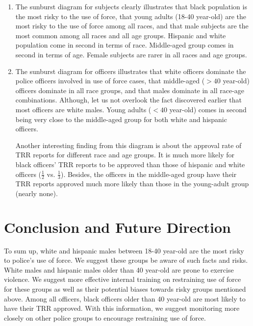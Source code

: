 \documentclass[10pt]{article}
\begin{document}
\begin{enumerate}

\item The sunburst diagram for subjects clearly illustrates that black population is the most risky to the use of force, that young adults (18-40 year-old) are the most risky to the use of force among all races, and that male subjects are the most common among all races and all age groups. Hispanic and white population come in second in terms of race. Middle-aged group comes in second in terms of age. Female subjects are rarer in all races and age groups.

\item The sunburst diagram for officers illustrates that white officers dominate the police officers involved in use of force cases, that middle-aged ($>40$ year-old) officers dominate in all race groups, and that males dominate in all race-age combinations. Although, let us not overlook the fact discovered earlier that most officers are white males. Young adults ($<40$ year-old) comes in second being very close to the middle-aged group for both white and hispanic officers.

Another interesting finding from this diagram is about the approval rate of TRR reports for different race and age groups. It is much more likely for black officers’ TRR reports to be approved than those of hispanic and white officers ($\frac{1}{2}$ vs. $\frac{1}{3}$). Besides, the officers in the middle-aged group have their TRR reports approved much more likely than those in the young-adult group (nearly none).

\end{enumerate}


\section{Conclusion and Future Direction}

To sum up, white and hispanic males between 18-40 year-old are the most risky to police’s use of force. We suggest these groups be aware of such facts and risks. White males and hispanic males older than 40 year-old are prone to exercise violence. We suggest more effective internal training on restraining use of force for these groups as well as their potential biases towards risky groups mentioned above. Among all officers, black officers older than 40 year-old are most likely to have their TRR approved. With this information, we suggest monitoring more closely on other police groups to encourage restraining use of force.
\end{document}
